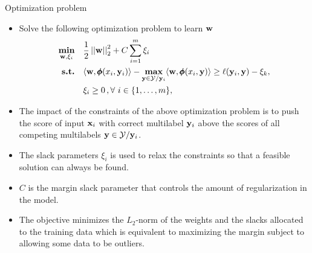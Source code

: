 \documentclass[first=dgreen,second=purple,logo=yellowexc]{aaltoslides}
\begin{document}
\begin{frame}{Optimization problem}
	\begin{itemize}
		\item Solve the following optimization problem to learn $\mathbf {w}$
		\begin{align*}
			\underset{\mathbf {w},\xi_i}{\textbf{min}} & \quad \frac{1}{2}\left|\left| \mathbf {w} \right|\right|_2^2 + C\sum_{i=1}^{m}\xi_i 	\\
			\textbf{s.t.} & \quad \langle \mathbf {w}, \pmb \phi(x_i,\mathbf {y}_i) \rangle - \underset{\mathbf {y}\in\mathcal{Y}/\mathbf {y}_i}{\textbf{max}} \langle \mathbf {w}, \pmb \phi(x_i,\mathbf {y}) \rangle \geq \ell(\mathbf {y}_i,\mathbf {y}) -  \xi_k,  \\
			& \quad \xi_i\ge0\, , \forall\ i \in \{ 1,\dots,m \},
		\end{align*}
		\item The impact of the constraints of the above optimization problem is to push the score of input $\mathbf {x}_i$ with correct multilabel $\mathbf {y}_i$ above the scores of all competing multilabels $\mathbf {y}\in\mathcal{Y}/\mathbf {y}_i$. 
		\item The slack parameters $\xi_i$ is used to relax the constraints so that a feasible solution can always be found.
		\item $C$ is the margin slack parameter that controls the amount of regularization in the model.
		\item The objective minimizes the $L_2$-norm of the weights and the slacks allocated to the training data which is equivalent to maximizing the margin subject to allowing some data to be outliers.
	\end{itemize}
\end{frame}
\end{document}
